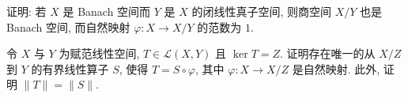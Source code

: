 \documentclass[../../main.tex]{subfiles}
\begin{document}
\begin{exercise}\label{exercise:ch13-21}
证明: 若 $X$ 是 Banach 空间而 $Y$ 是 $X$ 的闭线性真子空间, 则商空间 $X/Y$ 也是 Banach 空间, 而自然映射 $\varphi:X\to X/Y$ 的范数为 $1$.
\end{exercise}

\begin{exercise}\label{exercise:ch13-22}
令 $X$ 与 $Y$ 为赋范线性空间, $T\in\mathcal{L}(X,Y)$ 且 $\ker T=Z$. 证明存在唯一的从 $X/Z$ 到 $Y$ 的有界线性算子 $S$, 使得 $T=S\circ\varphi$, 其中 $\varphi:X\to X/Z$ 是自然映射. 此外, 证明 $\|T\|=\|S\|$.
\end{exercise}
\end{document}
